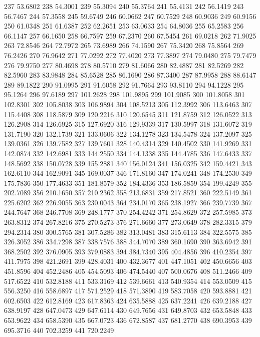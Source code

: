 237 53.6802
238 54.3001
239 55.3094
240 55.3764
241 55.4131
242 56.1419
243 56.7467
244 57.3558
245 59.6749
246 60.0662
247 60.7529
248 60.9036
249 60.9156
250 61.0348
251 61.6387
252 62.2651
253 63.0633
254 64.8036
255 65.2583
256 66.1147
257 66.1650
258 66.7597
259 67.2370
260 67.5454
261 69.0218
262 71.9025
263 72.8546
264 72.7972
265 73.6989
266 74.1590
267 75.3420
268 75.8564
269 76.2426
270 76.9642
271 77.0292
272 77.4020
273 77.3897
274 79.0480
275 79.7479
276 79.9750
277 80.4698
278 80.5710
279 81.6066
280 82.4887
281 82.5269
282 82.5960
283 83.9848
284 85.6528
285 86.1690
286 87.3400
287 87.9958
288 88.6147
289 89.1822
290 91.0995
291 91.6058
292 91.7664
293 93.8110
294 94.1228
295 95.1264
296 97.6189
297 101.2628
298 101.9895
299 101.9085
300 101.8058
301 102.8301
302 105.8038
303 106.9894
304 108.5213
305 112.3992
306 113.6463
307 115.4408
308 118.5879
309 120.2216
310 120.6545
311 121.8759
312 126.0522
313 126.2908
314 126.6925
315 127.6920
316 129.9339
317 130.5997
318 131.6072
319 131.7190
320 132.1739
321 133.0606
322 134.1278
323 134.5478
324 137.2097
325 139.0361
326 139.7582
327 139.7601
328 140.4314
329 140.4502
330 141.9269
331 142.0874
332 142.6981
333 144.2550
334 144.1338
335 144.4785
336 147.6433
337 148.5692
338 150.0728
339 155.2881
340 156.0124
341 156.0325
342 159.4421
343 162.6110
344 162.9091
345 169.0037
346 171.8160
347 174.0241
348 174.2530
349 175.7836
350 177.4633
351 181.8579
352 184.4336
353 186.5859
354 199.4249
355 202.7089
356 210.1650
357 210.2362
358 213.6831
359 217.8521
360 222.5149
361 225.6202
362 226.9055
363 230.0043
364 234.0170
365 238.1927
366 239.7739
367 244.7647
368 246.7708
369 248.1777
370 254.4242
371 254.8629
372 257.5985
373 263.8312
374 267.8216
375 270.5273
376 271.6660
377 273.0649
378 282.3315
379 294.2314
380 300.5765
381 307.5286
382 313.0481
383 315.6113
384 322.5575
385 326.3052
386 334.7298
387 338.7576
388 344.7070
389 360.1690
390 363.6942
391 368.2502
392 376.0905
393 379.0883
394 384.7340
395 404.4856
396 410.2354
397 411.7975
398 421.2691
399 428.4031
400 432.3677
401 447.1051
402 450.6656
403 451.8596
404 452.2486
405 454.5093
406 474.5440
407 500.0676
408 511.2466
409 517.6522
410 532.8188
411 533.3169
412 539.6661
413 540.9354
414 553.0509
415 556.3250
416 558.6897
417 571.2529
418 571.3890
419 583.7058
420 593.8881
421 602.6503
422 612.8169
423 617.8363
424 635.5888
425 637.2241
426 639.2188
427 638.9197
428 647.0473
429 647.6114
430 649.7656
431 649.8703
432 653.5848
433 653.9622
434 658.5390
435 667.0723
436 672.8587
437 681.2770
438 690.3953
439 695.3716
440 702.3259
441 720.2249
